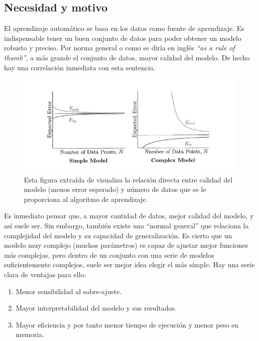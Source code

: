 \subsection{Necesidad y motivo}
El aprendizaje automático se basa en los datos como fuente de aprendizaje. Es indispensable tener un buen conjunto de datos para poder obtener un modelo robusto y preciso. Por norma general o como se diría en inglés \textit{``as a rule of thumb''}, a más grande el conjunto de datos, mayor calidad del modelo. De hecho hay una correlación inmediata con esta sentencia.

\begin{figure}[H]
    \begin{center}
        \includegraphics[width=1\textwidth]{imagenes/learning_from_data_vc.png}
    \end{center}
    \caption[Correlación entre error del modelo y N]{Esta figura extraída de \cite{Mostafa2012} visualiza la relación directa entre calidad del modelo (menos error esperado) y número de datos que se le proporciona al algoritmo de aprendizaje.}
    \label{fig:learning_from_data_vc}
\end{figure}

Es inmediato pensar que, a mayor cantidad de datos, mejor calidad del modelo, y así suele ser. Sin embargo, también existe una ``normal general'' que relaciona la complejidad del modelo y su capacidad de generalización. Es cierto que un modelo muy complejo (muchos parámetros) es capaz de ajustar mejor funciones más complejas, pero dentro de un conjunto con una serie de modelos suficientemente complejos, suele ser mejor idea elegir el más simple. Hay una serie clara de ventajas para ello:
\begin{enumerate}
    \item Menor  sensibilidad al sobre-ajuste.
    \item Mayor interpretabilidad del modelo y sus resultados.
    \item Mayor eficiencia y por tanto menor tiempo de ejecución y menor peso en memoria.
\end{enumerate}


